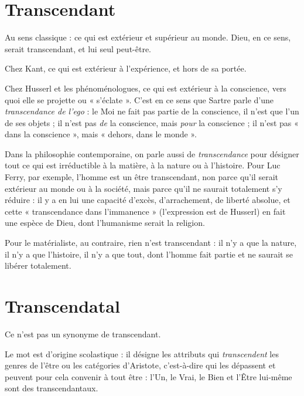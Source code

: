 \section{Transcendant}
Au sens classique : ce qui est extérieur et supérieur au
monde. Dieu, en ce sens, serait transcendant, et lui seul
peut-être.

Chez Kant, ce qui est extérieur à l'expérience, et hors de sa portée.

Chez Husserl et les phénoménologues, ce qui est extérieur à la conscience,
vers quoi elle se projette ou « s'éclate ». C’est en ce sens que Sartre parle d’une
{\it transcendance de l'ego} : le Moi ne fait pas partie de la conscience, il n’est que
l’un de ses objets ; il n’est pas {\it de} la conscience, mais {\it pour} la conscience ; il n’est
pas « dans la conscience », mais « dehors, dans le monde ».

Dans la philosophie contemporaine, on parle aussi de {\it transcendance} pour
désigner tout ce qui est irréductible à la matière, à la nature ou à l’histoire. Pour
Luc Ferry, par exemple, l'homme est un être transcendant, non parce qu’il
serait extérieur au monde ou à la société, mais parce qu’il ne saurait totalement
s’y réduire : il y a en lui une capacité d’excès, d’arrachement, de liberté absolue,
et cette « transcendance dans l’immanence » (l'expression est de Husserl) en fait
une espèce de Dieu, dont l’humanisme serait la religion.

Pour le matérialiste, au contraire, rien n’est transcendant : il n’y a que la
nature, il n’y a que l’histoire, il n’y a que tout, dont l’homme fait partie et ne
saurait se libérer totalement.

\section{Transcendatal}
Ce n’est pas un synonyme de transcendant.

Le mot est d’origine scolastique : il désigne les attributs
qui {\it transcendent} les genres de l’être ou les catégories d’Aristote, c’est-à-dire
qui les dépassent et peuvent pour cela convenir à tout être : l’Un, le Vrai, le
Bien et l’Être lui-même sont des transcendantaux.

